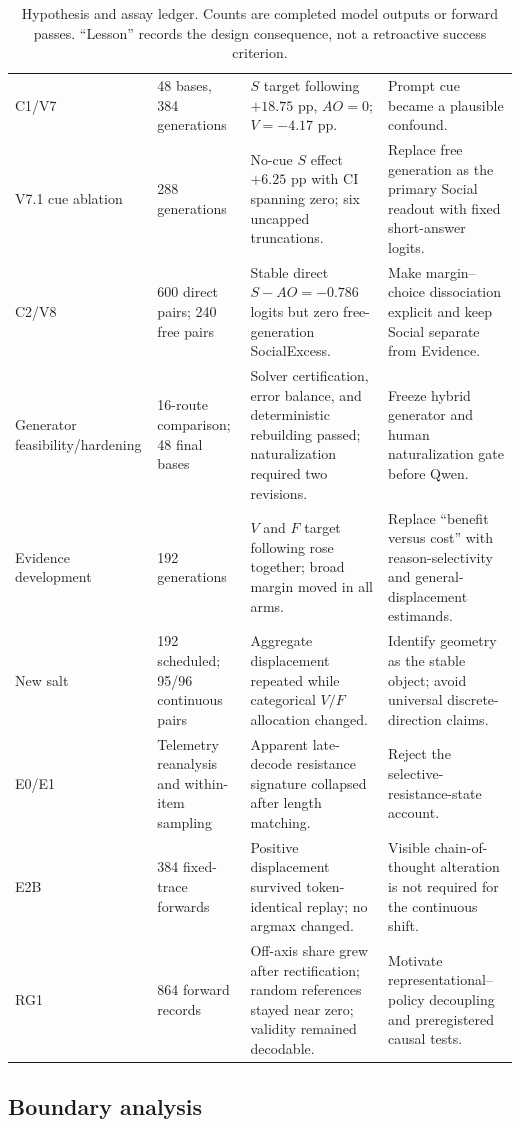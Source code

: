 \documentclass[letterpaper]{article}
\begin{document}
\begin{table}[t]
\begin{tabularx}{\textwidth}{L{1.65cm}L{2.1cm}L{3.4cm}Y}
C1/V7 & 48 bases, 384 generations & $S$ target following $+18.75$ pp, $AO=0$; $V=-4.17$ pp. & Prompt cue became a plausible confound. \\
V7.1 cue ablation & 288 generations & No-cue $S$ effect $+6.25$ pp with CI spanning zero; six uncapped truncations. & Replace free generation as the primary Social readout with fixed short-answer logits. \\
C2/V8 & 600 direct pairs; 240 free pairs & Stable direct $S-AO=-0.786$ logits but zero free-generation SocialExcess. & Make margin--choice dissociation explicit and keep Social separate from Evidence. \\
Generator feasibility/hardening & 16-route comparison; 48 final bases & Solver certification, error balance, and deterministic rebuilding passed; naturalization required two revisions. & Freeze hybrid generator and human naturalization gate before Qwen. \\
Evidence development & 192 generations & $V$ and $F$ target following rose together; broad margin moved in all arms. & Replace ``benefit versus cost'' with reason-selectivity and general-displacement estimands. \\
New salt & 192 scheduled; 95/96 continuous pairs & Aggregate displacement repeated while categorical $V/F$ allocation changed. & Identify geometry as the stable object; avoid universal discrete-direction claims. \\
E0/E1 & Telemetry reanalysis and within-item sampling & Apparent late-decode resistance signature collapsed after length matching. & Reject the selective-resistance-state account. \\
E2B & 384 fixed-trace forwards & Positive displacement survived token-identical replay; no argmax changed. & Visible chain-of-thought alteration is not required for the continuous shift. \\
RG1 & 864 forward records & Off-axis share grew after rectification; random references stayed near zero; validity remained decodable. & Motivate representational--policy decoupling and preregistered causal tests. \\
\bottomrule
\end{tabularx}
\caption{Hypothesis and assay ledger. Counts are completed model outputs or forward passes.  ``Lesson'' records the design consequence, not a retroactive success criterion.}
\label{tab:supp-history}
\end{table}

\subsection{Boundary analysis}
\end{document}
